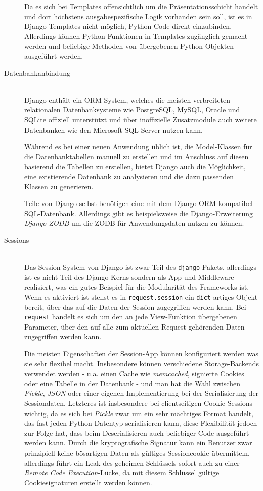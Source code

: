 \begin{description}
Da es sich bei Templates offensichtlich um die Präsentationsschicht handelt und dort höchstens
ausgabespezifische Logik vorhanden sein soll, ist es in Django-Templates nicht möglich, Python-Code
direkt einzubinden. Allerdings können Python-Funktionen in Templates zugänglich gemacht werden und
beliebige Methoden von übergebenen Python-Objekten ausgeführt werden.




\item[Datenbankanbindung] \hfill \\
Django enthält ein ORM-System, welches die meisten verbreiteten relationalen Datenbanksysteme wie
PostgreSQL, MySQL, Oracle und SQLite offiziell unterstützt und über inoffizielle Zusatzmodule auch
weitere Datenbanken wie den Microsoft SQL Server nutzen kann.

Während es bei einer neuen Anwendung üblich ist, die Model-Klassen für die Datenbanktabellen manuell
zu erstellen und im Anschluss auf diesen basierend die Tabellen zu erstellen, bietet Django auch die
Möglichkeit, eine existierende Datenbank zu analysieren und die dazu passenden Klassen zu
generieren.

Teile von Django selbst benötigen eine mit dem Django-ORM kompatibel SQL-Datenbank. Allerdings gibt
es beispielsweise die Django-Erweiterung \emph{Django-ZODB} um die ZODB für Anwendungsdaten nutzen
zu können.


\item[Sessions] \hfill \\
Das Session-System von Django ist zwar Teil des \lstinline{django}-Pakets, allerdings ist es nicht
Teil des Django-Kerns sondern als App und Middleware realisiert, was ein gutes Beispiel für die
Modularität des Frameworks ist. Wenn es aktiviert ist stellst es in \lstinline{request.session} ein
\lstinline{dict}-artiges Objekt bereit, über das auf die Daten der Session zugegriffen werden kann.
Bei \lstinline{request} handelt es sich um den an jede View-Funktion übergebenen Parameter, über den
auf alle zum aktuellen Request gehörenden Daten zugegriffen werden kann.

Die meisten Eigenschaften der Session-App können konfiguriert werden was sie sehr flexibel macht.
Insbesondere können verschiedene Storage-Backends verwendet werden - u.a. einen Cache wie
\emph{memcached}, signierte Cookies oder eine Tabelle in der Datenbank - und man hat die Wahl
zwischen \emph{Pickle}, \emph{JSON} oder einer eigenen Implementierung bei der Serialisierung der
Sessiondaten. Letzteres ist insbesondere bei clientseitigen Cookie-Sessions wichtig, da es sich bei
\emph{Pickle} zwar um ein sehr mächtiges Format handelt, das fast jeden Python-Datentyp
serialisieren kann, diese Flexibilität jedoch zur Folge hat, dass beim Deserialisieren auch
beliebiger Code ausgeführt werden kann. Durch die kryptografische Signatur kann ein Benutzer zwar
prinzipiell keine bösartigen Daten als gültiges Sessioncookie übermitteln, allerdings führt ein Leak
des geheimen Schlüssels sofort auch zu einer \emph{Remote Code Execution}-Lücke, da mit diesem
Schlüssel gültige Cookiesignaturen erstellt werden können.


\end{description}

